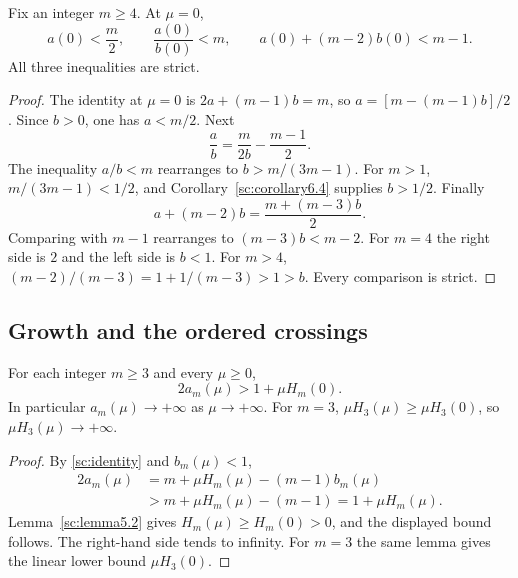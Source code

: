 \begin{lemma}\label{sc:lemma7.2}
Fix an integer \(m\ge 4\). At \(\mu=0\),
\[
a(0)<\frac m2,\qquad \frac{a(0)}{b(0)}<m,\qquad a(0)+(m-2)b(0)<m-1.
\]
All three inequalities are strict.

\end{lemma}
\begin{proof}
The identity at \(\mu=0\) is \(2a+(m-1)b=m\), so \(a=[m-(m-1)b]/2\). Since \(b>0\), one has \(a<m/2\). Next
\[
\frac a b=\frac{m}{2b}-\frac{m-1}{2}.
\]
The inequality \(a/b<m\) rearranges to \(b>m/(3m-1)\). For \(m>1\), \(m/(3m-1)<1/2\), and Corollary~\ref{sc:corollary6.4} supplies \(b>1/2\). Finally
\[
a+(m-2)b=\frac{m+(m-3)b}{2}.
\]
Comparing with \(m-1\) rearranges to \((m-3)b<m-2\). For \(m=4\) the right side is \(2\) and the left side is \(b<1\). For \(m>4\), \((m-2)/(m-3)=1+1/(m-3)>1>b\). Every comparison is strict.

\end{proof}

\subsection{Growth and the ordered crossings}\label{sc:sub8}

\begin{lemma}\label{sc:lemma8.1}
For each integer \(m\ge 3\) and every \(\mu\ge 0\),
\[
2a_m(\mu)>1+\mu H_m(0).
\]
In particular \(a_m(\mu)\to+\infty\) as \(\mu\to+\infty\). For \(m=3\), \(\mu H_3(\mu)\ge \mu H_3(0)\), so \(\mu H_3(\mu)\to+\infty\).

\end{lemma}
\begin{proof}
By \eqref{sc:identity} and \(b_m(\mu)<1\),
\begin{align*}
2a_m(\mu)&=m+\mu H_m(\mu)-(m-1)b_m(\mu)\\
&>m+\mu H_m(\mu)-(m-1)=1+\mu H_m(\mu).
\end{align*}
Lemma~\ref{sc:lemma5.2} gives \(H_m(\mu)\ge H_m(0)>0\), and the displayed bound follows. The right-hand side tends to infinity. For \(m=3\) the same lemma gives the linear lower bound \(\mu H_3(0)\).

\end{proof}

